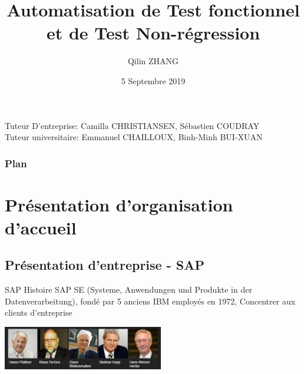 \documentclass{beamer}
\title[Soutenance de fin d'études]{Automatisation de Test fonctionnel et de Test Non-régression}
\author{Qilin ZHANG}
\institute{Sorbonne Université - Master 2 Informatique STL Alternance}
\date{5 Septembre 2019}
\begin{document}
    \begin{frame}
        
        \titlepage
        \footnotesize Tuteur D'entreprise: Camilla CHRISTIANSEN, Sébastien COUDRAY \\
Tuteur universitaire: Emmanuel CHAILLOUX, Binh-Minh BUI-XUAN
    \end{frame}
    
        
    \begin{frame}
        \frametitle{Plan}
        \tableofcontents
    \end{frame}
    
    \section{Présentation d'organisation d'accueil}
        \subsection{Présentation d'entreprise - SAP}
        
        \begin{frame}
            \begin{block} {SAP Histoire}
                SAP SE (Systeme, Anwendungen und Produkte in der Datenverarbeitung), fondé par 5 anciens IBM employés en 1972, 
                Concentrer aux clients d'entreprise
            \end{block}
            \includegraphics[width=7cm,]{sap_founders.jpg}
            
            
        \end{frame}
        
\end{document}
